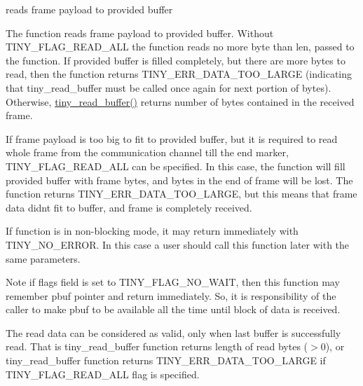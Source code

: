 reads frame payload to provided buffer 

The function reads frame payload to provided buffer. Without T\+I\+N\+Y\+\_\+\+F\+L\+A\+G\+\_\+\+R\+E\+A\+D\+\_\+\+A\+L\+L the function reads no more byte than len, passed to the function. If provided buffer is filled completely, but there are more bytes to read, then the function returns T\+I\+N\+Y\+\_\+\+E\+R\+R\+\_\+\+D\+A\+T\+A\+\_\+\+T\+O\+O\+\_\+\+L\+A\+R\+G\+E (indicating that tiny\+\_\+read\+\_\+buffer must be called once again for next portion of bytes). Otherwise, \hyperlink{group__ADVANCED__API_gade4e07eb12b8e32e6dd0c7b9757e8f39}{tiny\+\_\+read\+\_\+buffer()} returns number of bytes contained in the received frame.

If frame payload is too big to fit to provided buffer, but it is required to read whole frame from the communication channel till the end marker, T\+I\+N\+Y\+\_\+\+F\+L\+A\+G\+\_\+\+R\+E\+A\+D\+\_\+\+A\+L\+L can be specified. In this case, the function will fill provided buffer with frame bytes, and bytes in the end of frame will be lost. The function returns T\+I\+N\+Y\+\_\+\+E\+R\+R\+\_\+\+D\+A\+T\+A\+\_\+\+T\+O\+O\+\_\+\+L\+A\+R\+G\+E, but this means that frame data didn\textquotesingle{}t fit to buffer, and frame is completely received.

If function is in non-\/blocking mode, it may return immediately with T\+I\+N\+Y\+\_\+\+N\+O\+\_\+\+E\+R\+R\+O\+R. In this case a user should call this function later with the same parameters.

\begin{DoxyNote}{Note}
if flags field is set to T\+I\+N\+Y\+\_\+\+F\+L\+A\+G\+\_\+\+N\+O\+\_\+\+W\+A\+I\+T, then this function may remember pbuf pointer and return immediately. So, it is responsibility of the caller to make pbuf to be available all the time until block of data is received.

The read data can be considered as valid, only when last buffer is successfully read. That is tiny\+\_\+read\+\_\+buffer function returns length of read bytes ($>$0), or tiny\+\_\+read\+\_\+buffer function returns T\+I\+N\+Y\+\_\+\+E\+R\+R\+\_\+\+D\+A\+T\+A\+\_\+\+T\+O\+O\+\_\+\+L\+A\+R\+G\+E if T\+I\+N\+Y\+\_\+\+F\+L\+A\+G\+\_\+\+R\+E\+A\+D\+\_\+\+A\+L\+L flag is specified.
\end{DoxyNote}

